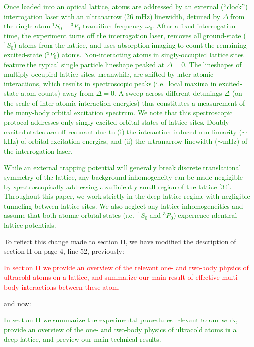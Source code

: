 \documentclass[preprint]{revtex4-1}
\newcommand{\1}{\mathds{1}}
\newcommand{\red}[1]{\textcolor{red}{#1}}
\newcommand{\green}[1]{\textcolor{green}{#1}}
\begin{document}
\begin{enumerate}
  \green{Once loaded into an optical lattice, atoms are addressed by
    an external (``clock'') interrogation laser with an ultranarrow
    (26 mHz) linewidth, detuned by $\Delta$ from the single-atom
    ${}^1S_0-{}^3P_0$ transition frequency $\omega_0$.  After a fixed
    interrogation time, the experiment turns off the interrogation
    laser, removes all ground-state (${}^1S_0$) atoms from the
    lattice, and uses absorption imaging to count the remaining
    excited-state (${}^3P_0$) atoms.  Non-interacting atoms in
    singly-occupied lattice sites feature the typical single particle
    lineshape peaked at $\Delta=0$.  The lineshapes of
    multiply-occupied lattice sites, meanwhile, are shifted by
    inter-atomic interactions, which results in spectroscopic peaks
    (i.e.~local maxima in excited-state atom counts) away from
    $\Delta=0$.  A sweep across different detunings $\Delta$ (on the
    scale of inter-atomic interaction energies) thus constitutes a
    measurement of the many-body orbital excitation spectrum.  We note
    that this spectroscopic protocol addresses only singly-excited
    orbital states of lattice sites.  Doubly-excited states are
    off-resonant due to (i) the interaction-induced non-linearity
    ($\sim$kHz) of orbital excitation energies, and (ii) the
    ultranarrow linewidth ($\sim$mHz) of the interrogation laser.}

  \green{While an external trapping potential will generally break
    discrete translational symmetry of the lattice, any background
    inhomogeneity can be made negligible by spectroscopically
    addressing a sufficiently small region of the lattice [34].
    Throughout this paper, we work strictly in the deep-lattice regime
    with negligible tunneling between lattice sites.  We also neglect
    any lattice inhomogeneities and assume that both atomic orbital
    states (i.e.~${}^1S_0$ and ${}^3P_0$) experience identical lattice
    potentials.}

  To reflect this change made to section II, we have modified the
  description of section II on page 4, line 52, previously:

  \red{In section II we provide an overview of the relevant one- and
    two-body physics of ultracold atoms on a lattice, and summarize
    our main result of effective multi-body interactions between these
    atom.}

  and now:

  \green{In section II we summarize the experimental procedures
    relevant to our work, provide an overview of the one- and two-body
    physics of ultracold atoms in a deep lattice, and preview our main
    technical results.}


\end{enumerate}
\end{document}
